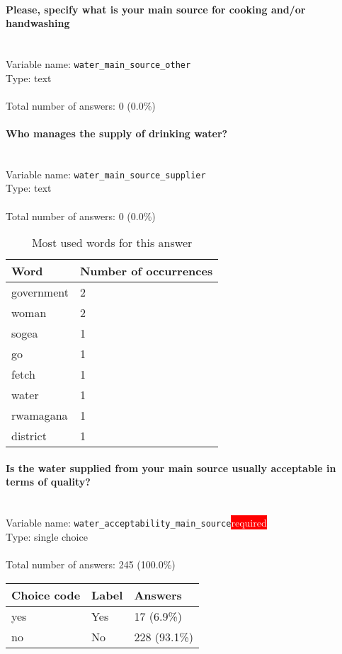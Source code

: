 \documentclass[11.5pt, a4paper]{scrartcl}
\begin{document}
\paragraph{Please, specify what is your main source for cooking and/or handwashing}
\  \\Variable name: \texttt{water\_main\_source\_other}\\
Type: text\\
\\Total number of answers: 0 (0.0\%)
\\[0.2em]\paragraph{Who manages the supply of drinking water?}
\  \\Variable name: \texttt{water\_main\_source\_supplier}\\
Type: text\\
\\Total number of answers: 0 (0.0\%)
\\[0.2em]\begin{table}[H]
 \begin{tabular}{p{4cm}|p{8cm}}
Word & Number of occurrences  \\
\hline
\cellcolor{mygray}government&\cellcolor{mygray}2\\
\hline
woman&2\\
\hline
\cellcolor{mygray}sogea&\cellcolor{mygray}1\\
\hline
go&1\\
\hline
\cellcolor{mygray}fetch&\cellcolor{mygray}1\\
\hline
water&1\\
\hline
\cellcolor{mygray}rwamagana&\cellcolor{mygray}1\\
\hline
district&1\\
\hline
\end{tabular}
\caption{\label{tab:table-name} Most used words for this answer}
\end{table}
\paragraph{Is the water supplied from your main source usually acceptable in terms of quality? }
\  \\Variable name: \texttt{water\_acceptability\_main\_source}\hfill\colorbox{red}{\small{\textcolor{white}{required}}}\\
 Type: single choice\\
\\Total number of answers: 245 (100.0\%)
\\[0.2em] \begin{tabular}{p{4cm}|p{8cm}|p{3cm}}
Choice code & Label & Answers \\
\hline
yes & Yes& \cellcolor{color0}17 (6.9\%)\\
\cellcolor{mygray} no & \cellcolor{mygray}No & \cellcolor{color4}228 (93.1\%)\\
\end{tabular}
\end{document}
